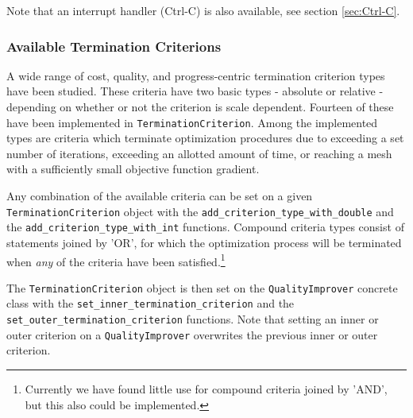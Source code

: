 \documentclass[letter]{report}
\begin{document}
Note that an interrupt handler (Ctrl-C) is also available, see section \ref{sec:Ctrl-C}. 

\subsubsection{Available Termination Criterions}
A wide range of cost, quality, 
and progress-centric termination
criterion types have been studied. These criteria have two basic types - 
absolute or relative - depending on whether or not the criterion is scale 
dependent.  Fourteen of these have been
implemented in \texttt{TerminationCriterion}.  Among the implemented
types are criteria which terminate optimization procedures due to
exceeding a set number of iterations, exceeding an allotted amount of
time, or reaching a mesh with a sufficiently small objective function
gradient.  

Any combination of the available criteria can be set on a given
\texttt{TerminationCriterion} object with the \texttt{add\_criterion\_type\_with\_double} and 
the \texttt{add\_criterion\_type\_with\_int} functions.  Compound criteria types consist
of statements joined by 'OR', for which 
the optimization process will be terminated when {\it any} of
the criteria have been satisfied.\footnote{Currently we have found little use
for compound criteria joined by 'AND', but this also could be implemented.}

The \texttt{TerminationCriterion} object is then set on the \texttt{QualityImprover} concrete class
with the \texttt{set\_inner\_termination\_criterion} and the \texttt{set\_outer\_termination\_criterion}
functions. Note that setting an inner or outer criterion on a \texttt{QualityImprover} overwrites
the previous inner or outer criterion.
\end{document}
